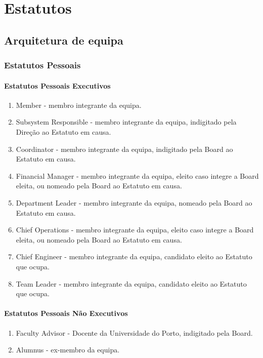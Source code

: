 \chapter{Estatutos}

\section{Arquitetura de equipa}

\subsection{Estatutos Pessoais}

\subsubsection{Estatutos Pessoais Executivos}
\begin{enumerate}[label=\thesubsubsection.\arabic*]
  \item Member - membro integrante da equipa.
  \item Subsystem Responsible - membro integrante da equipa, indigitado pela Direção ao Estatuto em causa.
  \item Coordinator - membro integrante da equipa, indigitado pela Board ao Estatuto em causa.
  \item Financial Manager - membro integrante da equipa, eleito caso integre a Board eleita, ou nomeado pela Board ao Estatuto em causa.
  \item Department Leader - membro integrante da equipa, nomeado pela Board ao Estatuto em causa.
  \item Chief Operations - membro integrante da equipa, eleito caso integre a Board eleita, ou nomeado pela Board ao Estatuto em causa.
  \item Chief Engineer - membro integrante da equipa, candidato eleito ao Estatuto que ocupa.
  \item Team Leader - membro integrante da equipa, candidato eleito ao Estatuto que ocupa.
\end{enumerate}

\subsubsection{Estatutos Pessoais Não Executivos}
\begin{enumerate}[label=\thesubsubsection.\arabic*]
  \item Faculty Advisor - Docente da Universidade do Porto, indigitado pela Board.
  \item Alumnus - ex-membro da equipa.
\end{enumerate}

